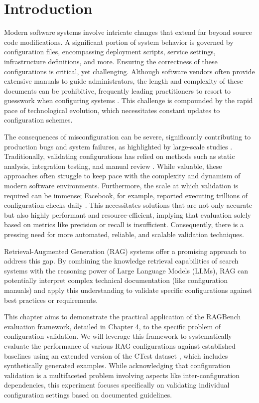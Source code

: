 \section{Introduction}
Modern software systems involve intricate changes that extend far beyond source code modifications. A significant portion of system behavior is governed by configuration files, encompassing deployment scripts, service settings, infrastructure definitions, and more. Ensuring the correctness of these configurations is critical, yet challenging. Although software vendors often provide extensive manuals to guide administrators, the length and complexity of these documents can be prohibitive, frequently leading practitioners to resort to guesswork when configuring systems \cite{Xiang.2020}. This challenge is compounded by the rapid pace of technological evolution, which necessitates constant updates to configuration schemes.

The consequences of misconfiguration can be severe, significantly contributing to production bugs and system failures, as highlighted by large-scale studies \cite{Tang.2015}. Traditionally, validating configurations has relied on methods such as static analysis, integration testing, and manual review \cite{Lian.2024}. While valuable, these approaches often struggle to keep pace with the complexity and dynamism of modern software environments. Furthermore, the scale at which validation is required can be immense; Facebook, for example, reported executing trillions of configuration checks daily \cite{Tang.2015}. This necessitates solutions that are not only accurate but also highly performant and resource-efficient, implying that evaluation solely based on metrics like precision or recall is insufficient. Consequently, there is a pressing need for more automated, reliable, and scalable validation techniques.

Retrieval-Augmented Generation (RAG) systems offer a promising approach to address this gap. By combining the knowledge retrieval capabilities of search systems with the reasoning power of Large Language Models (LLMs), RAG can potentially interpret complex technical documentation (like configuration manuals) and apply this understanding to validate specific configurations against best practices or requirements.

This chapter aims to demonstrate the practical application of the RAGBench evaluation framework, detailed in Chapter 4, to the specific problem of configuration validation. We will leverage this framework to systematically evaluate the performance of various RAG configurations against established baselines using an extended version of the CTest dataset \cite{Lian.2024}, which includes synthetically generated examples. While acknowledging that configuration validation is a multifaceted problem involving aspects like inter-configuration dependencies, this experiment focuses specifically on validating individual configuration settings based on documented guidelines.

